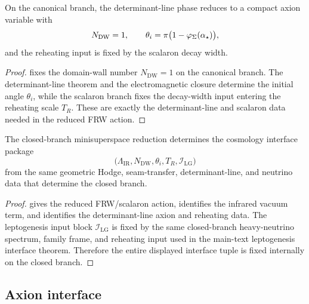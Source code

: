 \begin{lemma}
\label{lem:determinant-line-axion-reduction}
On the canonical branch, the determinant-line phase reduces to a compact axion variable with
\[
N_{\mathrm{DW}}=1,
\qquad
\theta_i=\pi\bigl(1-\varphi_{\Sigma}(\alpha_\star)\bigr),
\]
and the reheating input is fixed by the scalaron decay width.
\end{lemma}

\begin{proof}
 fixes the domain-wall number $N_{\mathrm{DW}}=1$ on the
canonical branch. The determinant-line theorem and the electromagnetic closure determine the initial
angle $\theta_i$, while the scalaron branch fixes the decay-width input entering the reheating scale
$T_R$. These are exactly the determinant-line and scalaron data needed in the reduced FRW action.
\end{proof}

\begin{theorem}
\label{thm:full-frw-interface-theorem}
The closed-branch minisuperspace reduction determines the cosmology interface package
\[
\bigl(\Lambda_{\mathrm{IR}},N_{\mathrm{DW}},\theta_i,T_R,\mathcal I_{\mathrm{LG}}\bigr)
\]
from the same geometric Hodge, seam-transfer, determinant-line, and neutrino data that determine
the closed branch.
\end{theorem}

\begin{proof}
 gives the reduced FRW/scalaron action,
 identifies the infrared vacuum term, and
 identifies the determinant-line axion and reheating
data. The leptogenesis input block $\mathcal I_{\mathrm{LG}}$ is fixed by the same closed-branch
heavy-neutrino spectrum, family frame, and reheating input used in the main-text leptogenesis
interface theorem. Therefore the entire displayed interface tuple is fixed internally on the closed
branch.
\end{proof}


\subsection{Axion interface}

